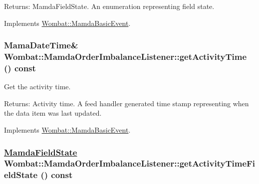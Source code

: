\begin{Desc}
\item[Returns:]Mamda\-Field\-State. An enumeration representing field state. \end{Desc}


Implements \hyperlink{classWombat_1_1MamdaBasicEvent_9cd58f3d7b5ebea42fa86e5dde46ab18}{Wombat::Mamda\-Basic\-Event}.\hypertarget{classWombat_1_1MamdaOrderImbalanceListener_f6441d47955f9cf7d8572a7c6e2816d3}{
\subsubsection[getActivityTime]{\setlength{\rightskip}{0pt plus 5cm}Mama\-Date\-Time\& Wombat::Mamda\-Order\-Imbalance\-Listener::get\-Activity\-Time () const}}
\label{classWombat_1_1MamdaOrderImbalanceListener_f6441d47955f9cf7d8572a7c6e2816d3}


Get the activity time. 

\begin{Desc}
\item[Returns:]Activity time. A feed handler generated time stamp representing when the data item was last updated. \end{Desc}


Implements \hyperlink{classWombat_1_1MamdaBasicEvent_b3810afc69474ef3b192ee4c9307e714}{Wombat::Mamda\-Basic\-Event}.\hypertarget{classWombat_1_1MamdaOrderImbalanceListener_e01441cb3be1b7466ece277699971fa3}{
\subsubsection[getActivityTimeFieldState]{\setlength{\rightskip}{0pt plus 5cm}\hyperlink{namespaceWombat_93aac974f2ab713554fd12a1fa3b7d2a}{Mamda\-Field\-State} Wombat::Mamda\-Order\-Imbalance\-Listener::get\-Activity\-Time\-Field\-State () const}}
\label{classWombat_1_1MamdaOrderImbalanceListener_e01441cb3be1b7466ece277699971fa3}


